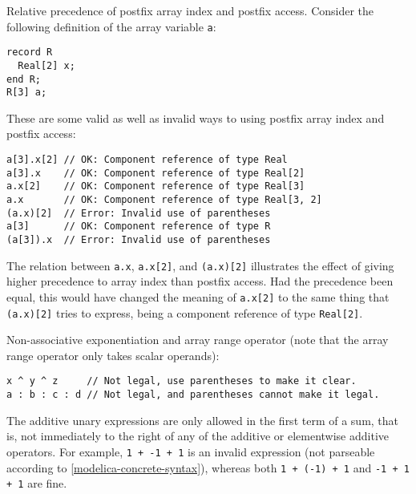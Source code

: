\begin{example}
Relative precedence of postfix array index and postfix access.
Consider the following definition of the array variable \lstinline!a!:
\begin{lstlisting}[language=modelica]
record R
  Real[2] x;
end R;
R[3] a;
\end{lstlisting}
These are some valid as well as invalid ways to using postfix array index and postfix access:
\begin{lstlisting}[language=modelica]
a[3].x[2] // OK: Component reference of type Real
a[3].x    // OK: Component reference of type Real[2]
a.x[2]    // OK: Component reference of type Real[3]
a.x       // OK: Component reference of type Real[3, 2]
(a.x)[2]  // Error: Invalid use of parentheses
a[3]      // OK: Component reference of type R
(a[3]).x  // Error: Invalid use of parentheses
\end{lstlisting}
The relation between \lstinline!a.x!, \lstinline!a.x[2]!, and \lstinline!(a.x)[2]! illustrates the effect of giving higher precedence to array index than postfix access.
Had the precedence been equal, this would have changed the meaning of \lstinline!a.x[2]! to the same thing that \lstinline!(a.x)[2]! tries to express, being a component reference of type \lstinline!Real[2]!.
\end{example}

\begin{example}
Non-associative exponentiation and array range operator (note that the array range operator only takes scalar operands):
\begin{lstlisting}[language=modelica]
x ^ y ^ z     // Not legal, use parentheses to make it clear.
a : b : c : d // Not legal, and parentheses cannot make it legal.
\end{lstlisting}
\end{example}

The additive unary expressions are only allowed in the first term of a sum, that is, not immediately to the right of any of the additive or elementwise additive operators.
For example, \lstinline!1 + -1 + 1! is an invalid expression (not parseable according to \cref{modelica-concrete-syntax}), whereas both \lstinline!1 + (-1) + 1! and \lstinline!-1 + 1 + 1! are fine.


